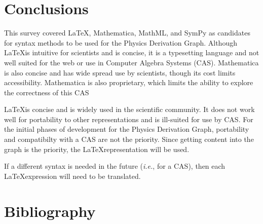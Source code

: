 \documentclass{article}
\newcommand{\ie}{\textit{i.e.}} %
\begin{document}
\begin{multicols}{2}
\section{Conclusions}

This survey covered \LaTeX, Mathematica, MathML, and SymPy as candidates for syntax methods to be used for the Physics Derivation Graph. Although \LaTeX is intuitive for scientists and is concise, it is a typesetting language and not well suited for the web or use in Computer Algebra Systems (CAS). Mathematica is also concise and has wide spread use by scientists, though its cost limits accessibility. Mathematica is also proprietary, which limits the ability to explore the correctness of this CAS

\LaTeX is concise and is widely used in the scientific community. It does not work well for portability to other representations and is ill-suited for use by CAS. For the initial phases of development for the Physics Derivation Graph, portability and compatibilty with a CAS are not the priority. Since getting content into the graph is the priority, the \LaTeX representation will be used.

If a different syntax is needed in the future (\ie, for a CAS), then each \LaTeX expression will need to be translated.

\section{Bibliography}


\end{multicols}

\newpage
\appendix

\end{document}
